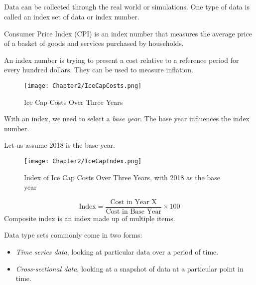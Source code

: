 \subsection{}

Data can be collected through the real world or simulations. 
One type of data is called an index set of data or index number.
\begin{example}
    Consumer Price Index (CPI) is an index number that measures the average price of a basket of goods and services purchased by households.
\end{example}
An index number is trying to present a cost relative to a reference period for every hundred dollars. They can be used to measure inflation.
\begin{figure}[h!]
    \centering
    \texttt{[image: Chapter2/IceCapCosts.png]}
    \caption{Ice Cap Costs Over Three Years}
\end{figure}
\newpage
With an index, we need to select a \emph{base year}.
The base year influences the index number.

Let us assume 2018 is the base year.
\begin{figure}[h!]
    \centering
    \texttt{[image: Chapter2/IceCapIndex.png]}
    \caption{Index of Ice Cap Costs Over Three Years, with 2018 as the base year}
\end{figure}
\begin{equation}
    \text{Index} = \frac{\text{Cost in Year X}}{\text{Cost in Base Year}} \times 100
\end{equation}
Composite index is an index made up of multiple items.

Data type sets commonly come in two forms:
\begin{itemize}
    \item \begin{definition}
        \emph{Time series data}, looking at particular data over a period of time.
    \end{definition}
    \item \begin{definition}
        \emph{Cross-sectional data}, looking at a snapshot of data at a particular point in time.
    \end{definition}
\end{itemize}